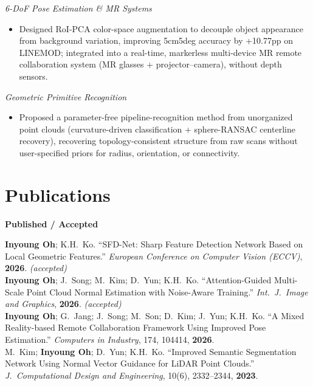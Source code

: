 \documentclass[10pt,a4paper]{article}
\begin{document}
	\vspace{0.6mm}
	{\small \textit{6-DoF Pose Estimation \& MR Systems}}
	\begin{itemize}[leftmargin=1.8em]
		\item Designed RoI-PCA color-space augmentation to decouple object appearance from background variation, improving 5cm5deg accuracy by +10.77pp on LINEMOD; integrated into a real-time, markerless multi-device MR remote collaboration system (MR glasses + projector--camera), without depth sensors.
	\end{itemize}
	
	\vspace{0.6mm}
	{\small \textit{Geometric Primitive Recognition}}
	\begin{itemize}[leftmargin=1.8em]
		\item Proposed a parameter-free pipeline-recognition method from unorganized point clouds (curvature-driven classification + sphere-RANSAC centerline recovery), recovering topology-consistent structure from raw scans without user-specified priors for radius, orientation, or connectivity.
	\end{itemize}
	
	\section*{Publications}
	{\small \textbf{Published / Accepted}}\vspace{0.5mm}
	
	\noindent
	\textbf{Inyoung Oh}; K.H.\ Ko.
	``SFD-Net: Sharp Feature Detection Network Based on Local Geometric Features.''
	\textit{European Conference on Computer Vision (ECCV)}, \textbf{2026}. \textit{(accepted)}\\
	
	\noindent
	\textbf{Inyoung Oh}; J.\ Song; M.\ Kim; D.\ Yun; K.H.\ Ko.
	``Attention-Guided Multi-Scale Point Cloud Normal Estimation with Noise-Aware Training.''
	\textit{Int.\ J.\ Image and Graphics}, \textbf{2026}. \textit{(accepted)}\\
	
	\noindent
	\textbf{Inyoung Oh}; G.\ Jang; J.\ Song; M.\ Son; D.\ Kim; J.\ Yun; K.H.\ Ko.
	``A Mixed Reality-based Remote Collaboration Framework Using Improved Pose Estimation.''
	\textit{Computers in Industry}, 174, 104414, \textbf{2026}.\\
	
	\noindent
	M.\ Kim; \textbf{Inyoung Oh}; D.\ Yun; K.H.\ Ko.
	``Improved Semantic Segmentation Network Using Normal Vector Guidance for LiDAR Point Clouds.''
	\textit{J.\ Computational Design and Engineering}, 10(6), 2332--2344, \textbf{2023}.\\
	
\end{document}
